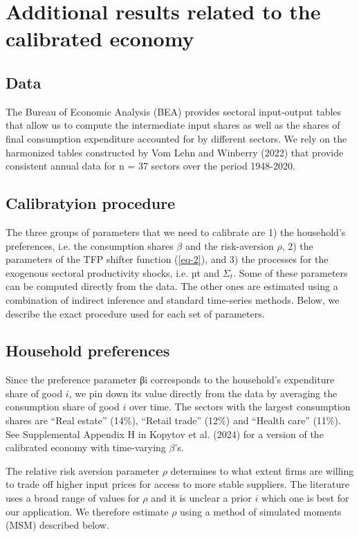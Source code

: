 \documentclass[11pt]{article}
\theoremstyle{definition}
\begin{document}
	\clearpage
	\section{Additional results related to the calibrated economy}
	\subsection{Data}
	The Bureau of Economic Analysis (BEA) provides sectoral input-output tables that allow us to compute the intermediate input shares as well as the shares of final consumption expenditure accounted for by different sectors. We rely on the harmonized tables constructed by Vom Lehn and Winberry (2022) that provide consistent annual data for n = 37 sectors over the period 1948-2020. 
	
	\subsection{Calibratyion procedure}
	The three groups of parameters that we need to calibrate are 1) the household’s preferences, i.e. the consumption shares $\beta$ and the risk-aversion $\rho$, 2) the parameters of the TFP shifter function (\ref{eq-2}), and 3) the processes for the exogenous sectoral productivity shocks, i.e. µt and $\Sigma_t$. Some of these parameters can be computed directly from the data. The other ones are estimated using a combination of indirect inference and standard time-series methods. Below, we describe the exact procedure used for each set of parameters.
	
	\subsection*{Household preferences}
	Since the preference parameter βi corresponds to the household’s expenditure share of good $i$, we pin down its value directly from the data by averaging the consumption share of good $i$ over time. The sectors with the largest consumption shares are ``Real estate'' (14\%), ``Retail trade'' (12\%) and ``Health care'' (11\%). See Supplemental Appendix H in Kopytov et al. (2024) for a version of the calibrated economy with time-varying $\beta$’s.
	
	The relative risk aversion parameter $\rho$ determines to what extent firms are willing to trade off higher input prices for access to more stable suppliers. The literature uses a broad range of values for $\rho$ and it is unclear a prior $i$ which one is best for our application. We therefore estimate $\rho$ using a method of simulated moments (MSM) described below.
	
\end{document}
